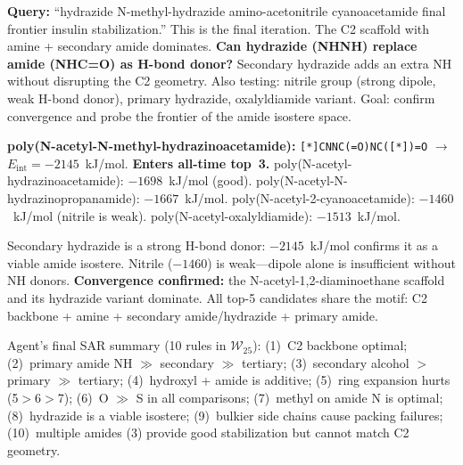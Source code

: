 \documentclass[twocolumn]{fairmeta}
\begin{document}
\begin{agentthought}
\scriptsize
\textbf{Query:} ``hydrazide N-methyl-hydrazide amino-acetonitrile cyanoacetamide final frontier insulin stabilization.''
This is the final iteration. The C2 scaffold with amine + secondary amide dominates.
\textbf{Can hydrazide (NHNH) replace amide (NHC=O) as H-bond donor?}
Secondary hydrazide adds an extra NH without disrupting the C2 geometry.
Also testing: nitrile group (strong dipole, weak H-bond donor), primary hydrazide, oxalyldiamide variant.
Goal: confirm convergence and probe the frontier of the amide isostere space.
\end{agentthought}

\begin{toolcall}
\scriptsize
\textbf{poly(N-acetyl-N-methyl-hydrazinoacetamide):} \texttt{[*]CNNC(=O)NC([*])=O} $\to$ $E_\text{int} = -2145$~kJ/mol. \textbf{Enters all-time top~3.}
poly(N-acetyl-hydrazinoacetamide): $-1698$~kJ/mol (good).
poly(N-acetyl-N-hydrazinopropanamide): $-1667$~kJ/mol.
poly(N-acetyl-2-cyanoacetamide): $-1460$~kJ/mol (nitrile is weak).
poly(N-acetyl-oxalyldiamide): $-1513$~kJ/mol.
\end{toolcall}

\begin{observation}
\scriptsize
Secondary hydrazide is a strong H-bond donor: $-2145$~kJ/mol confirms it as a viable amide isostere.
Nitrile ($-1460$) is weak---dipole alone is insufficient without NH donors.
\textbf{Convergence confirmed:} the N-acetyl-1,2-diaminoethane scaffold and its hydrazide variant dominate.
All top-5 candidates share the motif: C2 backbone + amine + secondary amide/hydrazide + primary amide.

Agent's final SAR summary (10 rules in $\mathcal{W}_{25}$): (1)~C2 backbone optimal; (2)~primary amide NH $\gg$ secondary $\gg$ tertiary; (3)~secondary alcohol $>$ primary $\gg$ tertiary; (4)~hydroxyl + amide is additive; (5)~ring expansion hurts (5$>$6$>$7); (6)~O $\gg$ S in all comparisons; (7)~methyl on amide N is optimal; (8)~hydrazide is a viable isostere; (9)~bulkier side chains cause packing failures; (10)~multiple amides (3) provide good stabilization but cannot match C2 geometry.
\end{observation}
\end{document}
